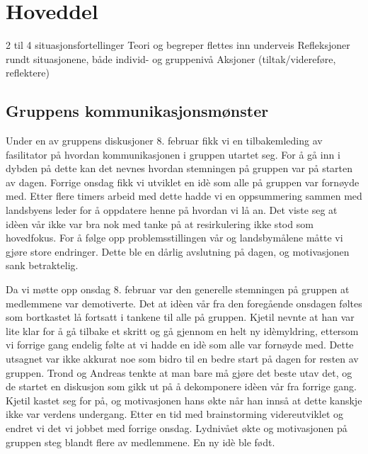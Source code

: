 \section{Hoveddel}
2 til 4 situasjonsfortellinger
Teori og begreper flettes inn underveis
Refleksjoner rundt situasjonene, både individ- og gruppenivå
Aksjoner (tiltak/videreføre, reflektere)


\subsection{Gruppens kommunikasjonsmønster} %
Under en av gruppens diskusjoner 8. februar fikk vi en tilbakemleding av fasilitator på hvordan kommunikasjonen i gruppen utartet seg. For å gå inn i dybden på dette kan det nevnes hvordan stemningen på gruppen var på starten av dagen. Forrige onsdag fikk vi utviklet en idè som alle på gruppen var fornøyde med. Etter flere timers arbeid med dette hadde vi en oppsummering sammen med landsbyens leder for å oppdatere henne på hvordan vi lå an. Det viste seg at idèen vår ikke var bra nok med tanke på at resirkulering ikke stod som hovedfokus. For å følge opp problemsstillingen vår og landsbymålene måtte vi gjøre store endringer. Dette ble en dårlig avslutning på dagen, og motivasjonen sank betraktelig. 

Da vi møtte opp onsdag 8. februar var den generelle stemningen på gruppen at medlemmene var demotiverte. Det at idèen vår fra den foregående onsdagen føltes som bortkastet lå fortsatt i tankene til alle på gruppen. Kjetil nevnte at han var lite klar for å gå tilbake et skritt og gå gjennom en helt ny idèmyldring, ettersom vi forrige gang endelig følte at vi hadde en idè som alle var fornøyde med. Dette utsagnet var ikke akkurat noe som bidro til en bedre start på dagen for resten av gruppen. Trond og Andreas tenkte at man bare må gjøre det beste utav det, og de startet en diskusjon som gikk ut på å dekomponere idèen vår fra forrige gang. Kjetil kastet seg for på, og motivasjonen hans økte når han innså at dette kanskje ikke var verdens undergang. Etter en tid med brainstorming videreutviklet og endret vi det vi jobbet med forrige onsdag. Lydnivået økte og motivasjonen på gruppen steg blandt flere av medlemmene. En ny idè ble født.

